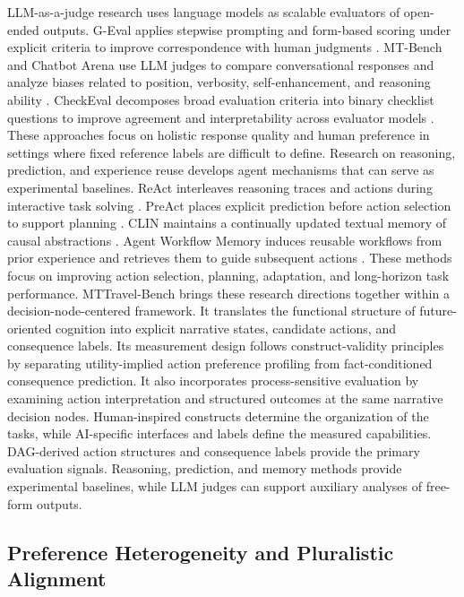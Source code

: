 \documentclass[pdflatex,sn-mathphys-num]{sn-jnl}%
\theoremstyle{thmstyleone}%
\theoremstyle{thmstyletwo}%
\theoremstyle{thmstylethree}%
\begin{document}
LLM-as-a-judge research uses language models as scalable evaluators of open-ended outputs. G-Eval applies stepwise prompting and form-based scoring under explicit criteria to improve correspondence with human judgments \cite{liu2023geval}. MT-Bench and Chatbot Arena use LLM judges to compare conversational responses and analyze biases related to position, verbosity, self-enhancement, and reasoning ability \cite{zheng2023judging}. CheckEval decomposes broad evaluation criteria into binary checklist questions to improve agreement and interpretability across evaluator models \cite{lee2025checkeval}. These approaches focus on holistic response quality and human preference in settings where fixed reference labels are difficult to define.
Research on reasoning, prediction, and experience reuse develops agent mechanisms that can serve as experimental baselines. ReAct interleaves reasoning traces and actions during interactive task solving \cite{yao2022react}. PreAct places explicit prediction before action selection to support planning \cite{fu2025preact}. CLIN maintains a continually updated textual memory of causal abstractions \cite{majumder2023clin}. Agent Workflow Memory induces reusable workflows from prior experience and retrieves them to guide subsequent actions \cite{wang2024agent}. These methods focus on improving action selection, planning, adaptation, and long-horizon task performance.
MTTravel-Bench brings these research directions together within a decision-node-centered framework. It translates the functional structure of future-oriented cognition into explicit narrative states, candidate actions, and consequence labels. Its measurement design follows construct-validity principles by separating utility-implied action preference profiling from fact-conditioned consequence prediction. It also incorporates process-sensitive evaluation by examining action interpretation and structured outcomes at the same narrative decision nodes. Human-inspired constructs determine the organization of the tasks, while AI-specific interfaces and labels define the measured capabilities. DAG-derived action structures and consequence labels provide the primary evaluation signals. Reasoning, prediction, and memory methods provide experimental baselines, while LLM judges can support auxiliary analyses of free-form outputs.

\subsection{Preference Heterogeneity and Pluralistic Alignment}
\end{document}
